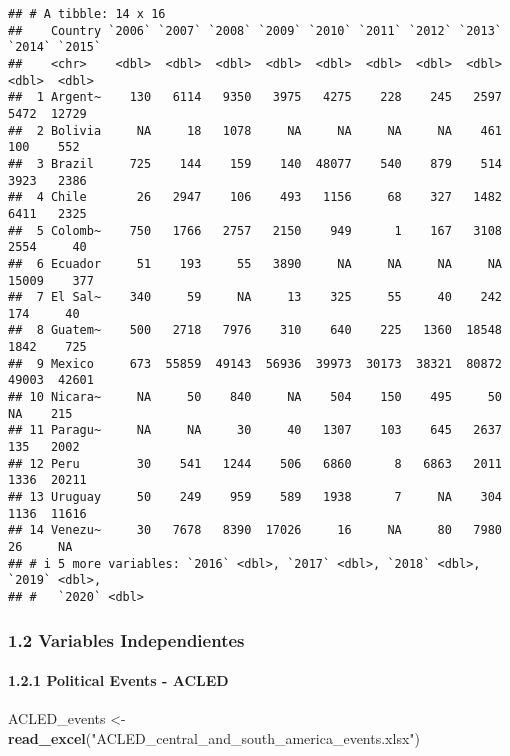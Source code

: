 \documentclass[
  11pt,
]{article}
\newenvironment{Shaded}{\begin{snugshade}}{\end{snugshade}}
\newcommand{\FunctionTok}[1]{\textcolor[rgb]{0.13,0.29,0.53}{\textbf{#1}}}
\newcommand{\NormalTok}[1]{#1}
\newcommand{\OtherTok}[1]{\textcolor[rgb]{0.56,0.35,0.01}{#1}}
\newcommand{\StringTok}[1]{\textcolor[rgb]{0.31,0.60,0.02}{#1}}
\begin{document}
\begin{verbatim}
## # A tibble: 14 x 16
##    Country `2006` `2007` `2008` `2009` `2010` `2011` `2012` `2013` `2014` `2015`
##    <chr>    <dbl>  <dbl>  <dbl>  <dbl>  <dbl>  <dbl>  <dbl>  <dbl>  <dbl>  <dbl>
##  1 Argent~    130   6114   9350   3975   4275    228    245   2597   5472  12729
##  2 Bolivia     NA     18   1078     NA     NA     NA     NA    461    100    552
##  3 Brazil     725    144    159    140  48077    540    879    514   3923   2386
##  4 Chile       26   2947    106    493   1156     68    327   1482   6411   2325
##  5 Colomb~    750   1766   2757   2150    949      1    167   3108   2554     40
##  6 Ecuador     51    193     55   3890     NA     NA     NA     NA  15009    377
##  7 El Sal~    340     59     NA     13    325     55     40    242    174     40
##  8 Guatem~    500   2718   7976    310    640    225   1360  18548   1842    725
##  9 Mexico     673  55859  49143  56936  39973  30173  38321  80872  49003  42601
## 10 Nicara~     NA     50    840     NA    504    150    495     50     NA    215
## 11 Paragu~     NA     NA     30     40   1307    103    645   2637    135   2002
## 12 Peru        30    541   1244    506   6860      8   6863   2011   1336  20211
## 13 Uruguay     50    249    959    589   1938      7     NA    304   1136  11616
## 14 Venezu~     30   7678   8390  17026     16     NA     80   7980     26     NA
## # i 5 more variables: `2016` <dbl>, `2017` <dbl>, `2018` <dbl>, `2019` <dbl>,
## #   `2020` <dbl>
\end{verbatim}

\subsubsection{1.2 Variables
Independientes}\label{variables-independientes}

\paragraph{1.2.1 Political Events -
ACLED}\label{political-events---acled}

\begin{Shaded}
\begin{Highlighting}[]
\NormalTok{ACLED\_events }\OtherTok{\textless{}{-}} \FunctionTok{read\_excel}\NormalTok{(}\StringTok{"ACLED\_central\_and\_south\_america\_events.xlsx"}\NormalTok{)}
\end{Highlighting}
\end{Shaded}
\end{document}
